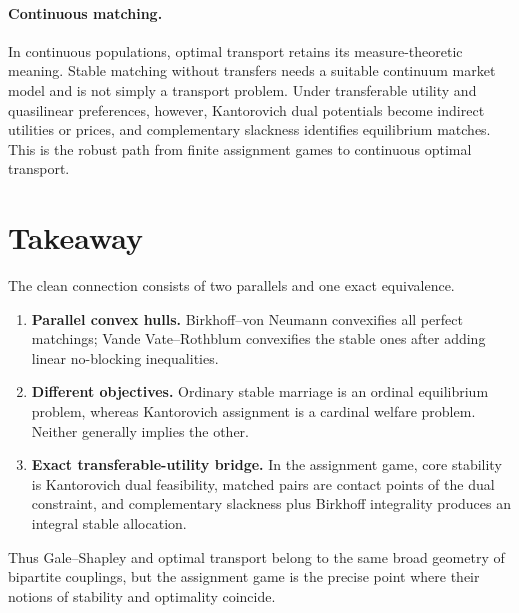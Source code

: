 \documentclass[11pt]{article}
\theoremstyle{definition}
\theoremstyle{remark}
\begin{document}
\paragraph{Continuous matching.}
In continuous populations, optimal transport retains its measure-theoretic
meaning. Stable matching without transfers needs a suitable continuum market
model and is not simply a transport problem. Under transferable utility and
quasilinear preferences, however, Kantorovich dual potentials become indirect
utilities or prices, and complementary slackness identifies equilibrium
matches. This is the robust path from finite assignment games to continuous
optimal transport.

\section{Takeaway}

The clean connection consists of two parallels and one exact equivalence.
\begin{enumerate}[label=\arabic*.,leftmargin=2em]
  \item \textbf{Parallel convex hulls.} Birkhoff--von Neumann convexifies all
  perfect matchings; Vande Vate--Rothblum convexifies the stable ones after
  adding linear no-blocking inequalities.
  \item \textbf{Different objectives.} Ordinary stable marriage is an ordinal
  equilibrium problem, whereas Kantorovich assignment is a cardinal welfare
  problem. Neither generally implies the other.
  \item \textbf{Exact transferable-utility bridge.} In the assignment game,
  core stability is Kantorovich dual feasibility, matched pairs are contact
  points of the dual constraint, and complementary slackness plus Birkhoff
  integrality produces an integral stable allocation.
\end{enumerate}
Thus Gale--Shapley and optimal transport belong to the same broad geometry of
bipartite couplings, but the assignment game is the precise point where their
notions of stability and optimality coincide.



\end{document}
